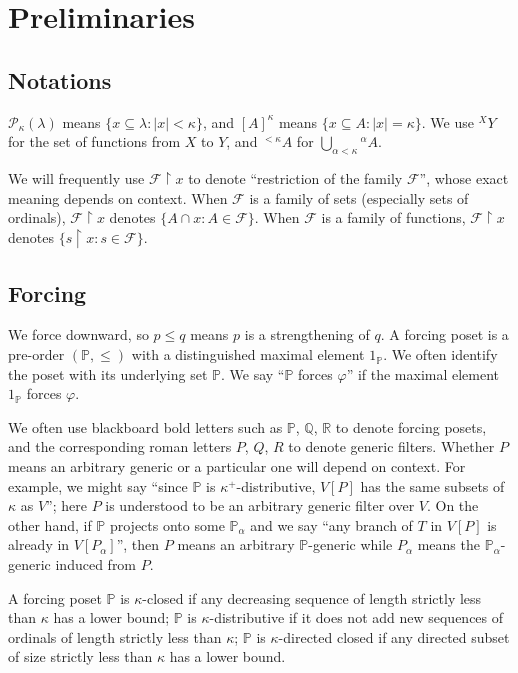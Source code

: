 \documentclass[10pt,reqno]{amsart}
\theoremstyle{plain}
\theoremstyle{definition}
\theoremstyle{remark}
\begin{document}
\section{Preliminaries}

\subsection{Notations}

$\mathcal{P}_\kappa(\lambda)$ means $\{x\subseteq\lambda:|x|<\kappa\}$, and $[A]^\kappa$ means $\{x\subseteq A:|x|=\kappa\}$. We use ${}^X Y$ for the set of functions from $X$ to $Y$, and ${}^{<\kappa}A$ for $\bigcup_{\alpha<\kappa}{}^\alpha A$.

We will frequently use $\mathcal{F}\upharpoonright x$ to denote ``restriction of the family $\mathcal{F}$'', whose exact meaning depends on context. When $\mathcal{F}$ is a family of sets (especially sets of ordinals), $\mathcal{F}\upharpoonright x$ denotes $\{A\cap x:A\in\mathcal{F}\}$. When $\mathcal{F}$ is a family of functions, $\mathcal{F}\upharpoonright x$ denotes $\{s\upharpoonright x:s\in\mathcal{F}\}$.

\subsection{Forcing}

We force downward, so $p\leq q$ means $p$ is a strengthening of $q$. A forcing poset is a pre-order $(\mathbb{P},\leq)$ with a distinguished maximal element $1_{\mathbb{P}}$. We often identify the poset with its underlying set $\mathbb{P}$. We say ``$\mathbb{P}$ forces $\varphi$'' if the maximal element $1_{\mathbb{P}}$ forces $\varphi$.

We often use blackboard bold letters such as $\mathbb{P}$, $\mathbb{Q}$, $\mathbb{R}$ to denote forcing posets, and the corresponding roman letters $P$, $Q$, $R$ to denote generic filters. Whether $P$ means an arbitrary generic or a particular one will depend on context. For example, we might say ``since $\mathbb{P}$ is $\kappa^+$-distributive, $V[P]$ has the same subsets of $\kappa$ as $V$''; here $P$ is understood to be an arbitrary generic filter over $V$. On the other hand, if $\mathbb{P}$ projects onto some $\mathbb{P}_\alpha$ and we say ``any branch of $T$ in $V[P]$ is already in $V[P_\alpha]$'', then $P$ means an arbitrary $\mathbb{P}$-generic while $P_\alpha$ means the $\mathbb{P}_\alpha$-generic induced from $P$.

A forcing poset $\mathbb{P}$ is $\kappa$-closed if any decreasing sequence of length strictly less than $\kappa$ has a lower bound; $\mathbb{P}$ is $\kappa$-distributive if it does not add new sequences of ordinals of length strictly less than $\kappa$; $\mathbb{P}$ is $\kappa$-directed closed if any directed subset of size strictly less than $\kappa$ has a lower bound.
\end{document}
